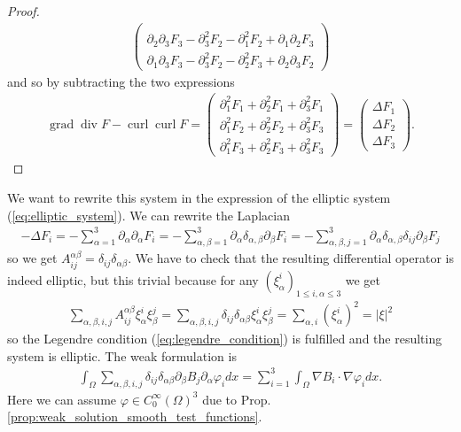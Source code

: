 \documentclass[12pt,a4paper]{article}
\numberwithin{equation}{subsection}
\numberwithin{lemma}{subsection}
\theoremstyle{definition}
\DeclareMathOperator{\curl}{curl}
\DeclareMathOperator{\diver}{div}
\DeclareMathOperator{\grad}{grad}
\begin{document}
\begin{proof}
\begin{align*}
\begin{pmatrix}
            \\ \partial_2 \partial_3 F_3 - \partial^2_3 F_2 - \partial_1^2 F_2
            + \partial_1 \partial_2 F_3
            \\ \partial_1 \partial_3 F_3 - \partial^2_3 F_2 - \partial_2^2 F_3
            + \partial_2 \partial_3 F_2  
            \end{pmatrix}
    \end{align*}
    and so by subtracting the two expressions
    \begin{align*}
        \grad \diver F - \curl \curl F  
        = \begin{pmatrix}
            \partial_1^2 F_1 + \partial_2^2 F_1 + \partial_3^2 F_1
            \\ \partial_1^2 F_2 + \partial_2^2 F_2 + \partial_3^2 F_3
            \\ \partial_1^2 F_3 + \partial_2^2 F_3 + \partial_3^2 F_3
        \end{pmatrix}
        = \begin{pmatrix}
            \Delta F_1 \\ \Delta F_2 \\ \Delta F_3
        \end{pmatrix}.
    \end{align*}
\end{proof}
We want to rewrite this system in the expression of the elliptic system 
(\ref{eq:elliptic_system}). We can rewrite the Laplacian
\begin{align*}
    - \Delta F_i = - \sum\limits_{\alpha = 1}^3 
        \partial_\alpha \partial_\alpha F_i
    = - \sum\limits_{\alpha,\beta = 1}^3 
    \partial_\alpha \delta_{\alpha,\beta} \partial_\beta F_i
    = - \sum\limits_{\alpha,\beta,j = 1}^3 
    \partial_\alpha \delta_{\alpha,\beta} \delta_{ij} \partial_\beta F_j
\end{align*}
so we get $A_{ij}^{\alpha\beta} = \delta_{ij} \delta_{\alpha \beta}$.
We have to check that the resulting differential operator is indeed
elliptic, but this trivial because for any 
$(\xi_\alpha^i)_{1\leq i,\alpha \leq 3}$
we get 
\begin{align*}
    \sum\limits_{\alpha,\beta,i,j} A_{ij}^{\alpha\beta} \xi_\alpha^i \xi_\beta^j 
    = \sum\limits_{\alpha,\beta,i,j} \delta_{ij} \delta_{\alpha \beta} 
        \xi_\alpha^i \xi_\beta^j 
    = \sum\limits_{\alpha,i} (\xi_\alpha^i)^2 = |\xi|^2
\end{align*}
so  the Legendre condition (\ref{eq:legendre_condition}) 
is fulfilled and the resulting system is elliptic. The weak formulation 
is 
\begin{align*}
    \int_\Omega \sum\limits_{\alpha,\beta,i,j} \delta_{ij} \delta_{\alpha\beta}
        \partial_\beta B_j \partial_\alpha \varphi_i dx 
    = \sum\limits_{i=1}^3 \int_\Omega \nabla B_i \cdot \nabla \varphi_i dx.
\end{align*}
Here we can assume $\varphi \in C_0^\infty (\Omega)^3$
due to Prop.\,\ref{prop:weak_solution_smooth_test_functions}.
\end{document}
